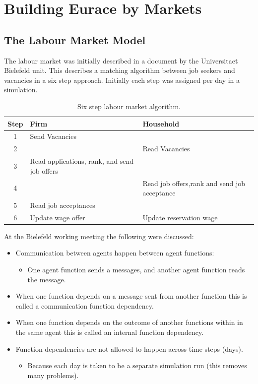 \documentclass[a4paper,11pt]{article}
\begin{document}
\pagebreak

\section{Building Eurace by Markets}

\subsection{The Labour Market Model}

The labour market was initially described in a document by the
Universitaet Bielefeld unit. This describes a matching algorithm
between job seekers and vacancies in a six step approach. Initially
each step was assigned per day in a simulation.

\begin{table}[hbtp]
\centering
\begin{tabular}{|c|p{2.0in}|p{2.0in}|}
\hline
Step & Firm & Household\\
\hline \hline
1 & Send Vacancies & \\
\hline
2 & & Read Vacancies\\
\hline
3 & Read applications, rank, and send job offers &\\
\hline
4 & & Read job offers,rank and send job acceptance\\
\hline
5& Read job acceptances & \\
\hline
6 &Update wage offer & Update reservation wage\\
\hline
\end{tabular}
\caption{Six step labour market algorithm.} \label{tab:6step}
\end{table}

At the Bielefeld working meeting the following were discussed:
\begin{itemize}
\item Communication between agents happen between agent functions:
\begin{itemize}
          \item One agent function sends a messages, and another agent function reads the
          message.
          \end{itemize}
\item When one function depends on a message sent from another
function this is called a communication function dependency.
\item When one function depends on the outcome of another functions within in the same agent this is called an internal function dependency.
    \item Function dependencies are not allowed to happen across time steps
    (days).
         \begin{itemize}
         \item Because each day is taken to be a separate simulation run (this removes many
         problems).
\end{itemize}
\end{itemize}
\end{document}
